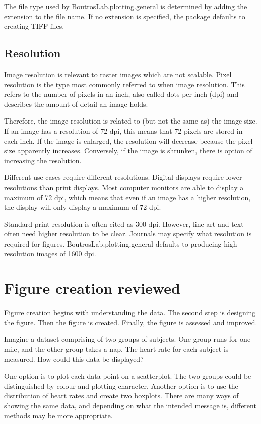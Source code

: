 \documentclass[letterpaper]{report}\usepackage[]{graphicx}\usepackage[]{color}
\begin{document}
The file type used by BoutrosLab.plotting.general is determined by adding the extension to the file name. If no extension is specified, the package defaults to creating TIFF files.

\subsection{Resolution}
Image resolution is relevant to raster images which are not scalable. Pixel resolution is the type most commonly referred to when image resolution. This refers to the number of pixels in an inch, also called dots per inch (dpi) and describes the amount of detail an image holds.

Therefore, the image resolution is related to (but not the same as) the image size. If an image has a resolution of 72 dpi, this means that 72 pixels are stored in each inch. If the image is enlarged, the resolution will decrease because the pixel size apparently increases. Conversely, if the image is shrunken, there is option of increasing the resolution.

Different use-cases require different resolutions. Digital displays require lower resolutions than print displays. Most computer monitors are able to display a maximum of 72 dpi, which means that even if an image has a higher resolution, the display will only display a maximum of 72 dpi. 

Standard print resolution is often cited as 300 dpi. However, line art and text often need higher resolution to be clear. Journals may specify what resolution is required for figures. BoutrosLab.plotting.general defaults to producing high resolution images of 1600 dpi.

\section{Figure creation reviewed}
Figure creation begins with understanding the data. The second step is designing the figure. Then the figure is created. Finally, the figure is assessed and improved.

Imagine a dataset comprising of two groups of subjects. One group runs for one mile, and the other group takes a nap. The heart rate for each subject is measured. How could this data be displayed? 

One option is to plot each data point on a scatterplot. The two groups could be distinguished by colour and plotting character. Another option is to use the distribution of heart rates and create two boxplots. There are many ways of showing the same data, and depending on what the intended message is, different methods may be more appropriate.
\end{document}
